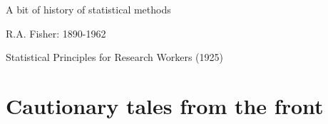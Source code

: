 \documentclass{beamer}
\begin{document}
\begin{frame}{A bit of history of statistical methods}
 
 R.A. Fisher: 1890-1962
 
 
 Statistical Principles for Research Workers (1925)

\end{frame}

\section{Cautionary tales from the front}

\end{document}
